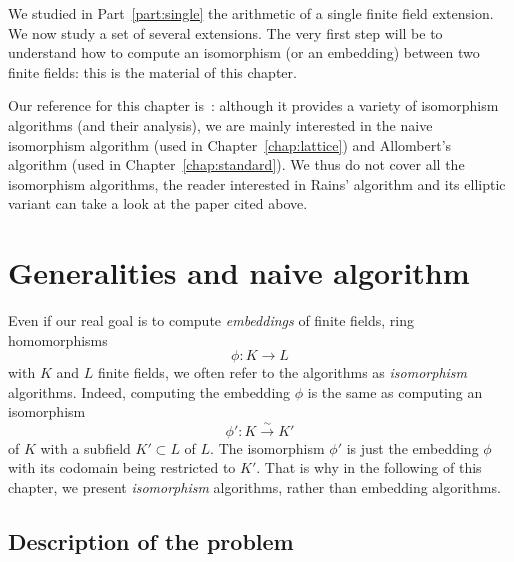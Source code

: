 We studied in Part~\ref{part:single} the arithmetic of a single finite field
extension. We now study a set of several extensions. The very first step will be
to understand how to compute an isomorphism (or an embedding) between two finite
fields: this is the material of this chapter.
\minitoc


\clearpage

Our reference for this chapter is~\cite{BDDFS17}: although it provides a variety
of isomorphism algorithms (and their analysis), we are mainly interested in the
naive isomorphism algorithm (used in
Chapter~\ref{chap:lattice}) and Allombert's algorithm (used in
Chapter~\ref{chap:standard}). We thus do not cover all the isomorphism
algorithms, the reader interested in Rains' algorithm and its elliptic variant
can take a look at the paper cited above.

\section{Generalities and naive algorithm}

Even if our real goal is to compute \emph{embeddings} of finite fields, \ie
ring homomorphisms
\[
  \phi:K\to L
\]
with $K$ and $L$ finite fields, we often refer to the algorithms as
\emph{isomorphism} algorithms. Indeed, computing the embedding $\phi$ is
the same as computing an isomorphism
\[
  \phi':K\overset{\sim}{\to} K'
\]
of $K$ with a subfield $K'\subset L$ of $L$. The
isomorphism $\phi'$ is just the embedding $\phi$ with its codomain being
restricted to $K'$. That is why in the following of this chapter, we present
\emph{isomorphism} algorithms, rather than embedding algorithms.

\subsection{Description of the problem}


